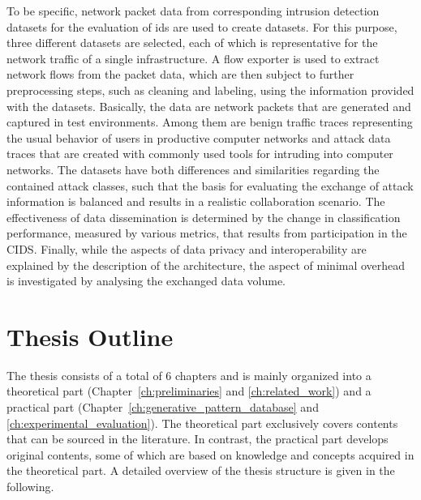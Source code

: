 \documentclass[../../main.tex]{subfiles}
\begin{document}
To be specific, network packet data from corresponding intrusion detection datasets for the evaluation of \gls{ids} are used to create datasets. For this purpose, three different datasets are selected, each of which is representative for the network traffic of a single infrastructure. A flow exporter is used to extract network flows from the packet data, which are then subject to further preprocessing steps, such as cleaning and labeling, using the information provided with the datasets.
Basically, the data are network packets that are generated and captured in test environments. Among them are benign traffic traces representing the usual behavior of users in productive computer networks and attack data traces that are created with commonly used tools for intruding into computer networks. The datasets have both differences and similarities regarding the contained attack classes, such that the basis for evaluating the exchange of attack information is balanced and results in a realistic collaboration scenario. The effectiveness of data dissemination is determined by the change in classification performance, measured by various metrics, that results from participation in the CIDS. Finally, while the aspects of data privacy and interoperability are explained by the description of the architecture, the aspect of minimal overhead is investigated by analysing the exchanged data volume.

\section{Thesis Outline}\label{sec:outline}

The thesis consists of a total of 6 chapters and is mainly organized into a theoretical part (Chapter~\ref{ch:preliminaries} and \ref{ch:related_work}) and a practical part (Chapter~\ref{ch:generative_pattern_database} and \ref{ch:experimental_evaluation}). The theoretical part exclusively covers contents that can be sourced in the literature. In contrast, the practical part develops original contents, some of which are based on knowledge and concepts acquired in the theoretical part. A detailed overview of the thesis structure is given in the following.
\end{document}
